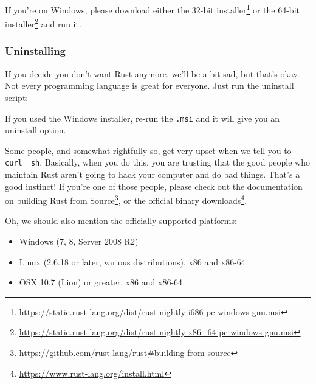 \documentclass[a4paper,]{book}
\newenvironment{Shaded}{\begin{snugshade}}{\end{snugshade}}
\newcommand{\KeywordTok}[1]{\textcolor[rgb]{0.13,0.29,0.53}{\textbf{{#1}}}}
\newcommand{\NormalTok}[1]{{#1}}
\renewcommand{\href}[2]{#2\footnote{\url{#1}}}
\providecommand{\tightlist}{%
  \setlength{\itemsep}{0pt}\setlength{\parskip}{0pt}}
\begin{document}
\begin{Shaded}
\end{Shaded}

If you're on Windows, please download either the
\href{https://static.rust-lang.org/dist/rust-nightly-i686-pc-windows-gnu.msi}{32-bit
installer} or the
\href{https://static.rust-lang.org/dist/rust-nightly-x86_64-pc-windows-gnu.msi}{64-bit
installer} and run it.

\subsubsection{Uninstalling}\label{uninstalling-1}

If you decide you don't want Rust anymore, we'll be a bit sad, but
that's okay. Not every programming language is great for everyone. Just
run the uninstall script:

\begin{Shaded}
\end{Shaded}

If you used the Windows installer, re-run the \texttt{.msi} and it will
give you an uninstall option.

Some people, and somewhat rightfully so, get very upset when we tell you
to \texttt{curl\ \textbar{}\ sh}. Basically, when you do this, you are
trusting that the good people who maintain Rust aren't going to hack
your computer and do bad things. That's a good instinct! If you're one
of those people, please check out the documentation on
\href{https://github.com/rust-lang/rust\#building-from-source}{building
Rust from Source}, or \href{https://www.rust-lang.org/install.html}{the
official binary downloads}.

Oh, we should also mention the officially supported platforms:

\begin{itemize}
\tightlist
\item
  Windows (7, 8, Server 2008 R2)
\item
  Linux (2.6.18 or later, various distributions), x86 and x86-64
\item
  OSX 10.7 (Lion) or greater, x86 and x86-64
\end{itemize}
\end{document}
